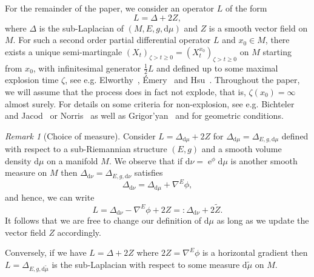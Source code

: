 \documentclass[10pt]{amsart}
\newcounter{dummy} \numberwithin{dummy}{section}
\theoremstyle{remark}
\newtheorem{remark}[dummy]{Remark}
\newcommand{\db}{{\mathrm d}}
\newcommand{\e}{\operatorname{e}}
\numberwithin{equation}{section}
\begin{document}
For the remainder of the paper, we consider an operator $L$ of the form
\begin{displaymath}
    L = \Delta + 2Z,
\end{displaymath}
where $\Delta$ is the sub-Laplacian of $(M,E,g,\db\mu)$ and $Z$ is a smooth vector field on $M$. For such a second order partial differential operator $L$ and $x_0\in M$, there exists a unique semi-martingale $(X_t)_{\zeta>t\geq 0} = (X_t^{x_0})_{\zeta>t\geq 0}$ on $M$ starting from $x_0$, with infinitesimal generator $\frac{1}{2}L$ and defined up to some maximal explosion time $\zeta$, see e.g. Elworthy~\cite{elworthy}, \'Emery~\cite{emery} and Hsu~\cite{hsu}. Throughout the paper, we will assume that the process does in fact not explode, that is, $\zeta(x_0)=\infty$ almost surely. For details on some criteria for non-explosion, see e.g. Bichteler and Jacod~\cite{bichtelerjacod} or Norris~\cite{norris86} as well as Grigor’yan~\cite{grigor2013stochastic} and \cite{grong2019stochastic} for geometric conditions.

\begin{remark}[Choice of measure] \label{re:ChoiceMeasure}
Consider $L = \Delta_{\db\mu}+2Z$ for $\Delta_{\db\mu} = \Delta_{E,g,\db\mu}$ defined with respect to a sub-Riemannian structure $(E,g)$ and a smooth volume density $\db\mu$ on a manifold $M$. We observe that if $\db\nu = \e^{\phi} \db\mu$ is another smooth measure on $M$ then $\Delta_{\db\nu} = \Delta_{E,g,\db\nu}$ satisfies
\begin{displaymath}
    \Delta_{\db\nu}=\Delta_{\db\mu} + \nabla^E \phi,
\end{displaymath}
and hence, we can write
\begin{displaymath}
    L = \Delta_{\db\nu} - \nabla^E \phi + 2Z =: \Delta_{\db\nu} + 2\tilde Z.
\end{displaymath}
It follows that we are free to change our definition of $\db\mu$ as long as we update the vector field $Z$ accordingly.

Conversely, if we have $L = \Delta + 2Z$ where $2Z = \nabla^E \phi$ is a horizontal gradient then $L = \Delta_{E,g,\db\tilde \mu}$ is the sub-Laplacian with respect to some measure $\db\tilde \mu$ on $M$.
\end{remark}
\end{document}
